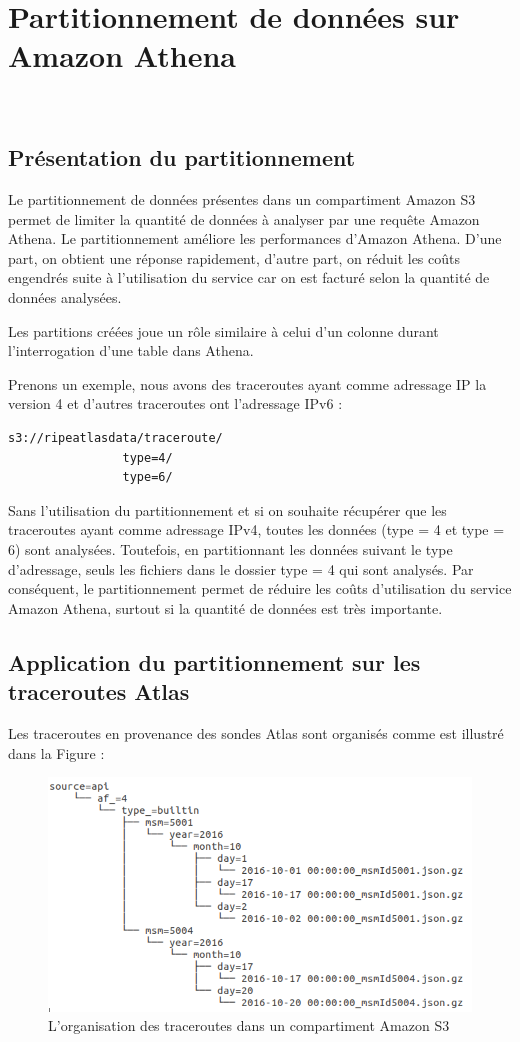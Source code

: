 \section{Partitionnement de données sur Amazon Athena } \label{subsubsection:partitionnement}~
\subsection{Présentation du partitionnement}
Le partitionnement  de données présentes dans un compartiment Amazon S3 permet de limiter la quantité de données à analyser par une requête Amazon Athena. Le partitionnement améliore  les performances d'Amazon Athena. D'une part, on obtient une réponse rapidement, d'autre part, on réduit les coûts engendrés  suite à l'utilisation du service car on est facturé selon la quantité de données analysées.  

Les partitions créées joue un rôle similaire à celui d'un colonne durant l'interrogation d'une table dans Athena. 

Prenons un exemple, nous avons des traceroutes ayant comme adressage IP la version  4 et d'autres traceroutes ont l'adressage IPv6 :

\begin{lstlisting}
s3://ripeatlasdata/traceroute/
				type=4/
				type=6/
\end{lstlisting}

Sans l'utilisation du partitionnement et si on souhaite récupérer que les traceroutes ayant comme adressage IPv4, toutes les données (type = 4 et type = 6) sont analysées. Toutefois, en partitionnant les données suivant le type d'adressage, seuls les fichiers dans le dossier type = 4 qui sont analysés. Par conséquent, le partitionnement permet de réduire les coûts d'utilisation du service Amazon Athena, surtout si la quantité de données est très importante. 


\subsection{Application du partitionnement sur les traceroutes Atlas}

Les traceroutes en provenance des sondes Atlas sont organisés comme est illustré dans la Figure :

\begin{figure}[H]
	\centering
	\includegraphics[width=0.6\linewidth]{illustrations/partitionnement-athena}
	\caption{L'organisation des traceroutes dans un compartiment Amazon S3}
	\label{fig:partitionnement-athena}
\end{figure}
 

